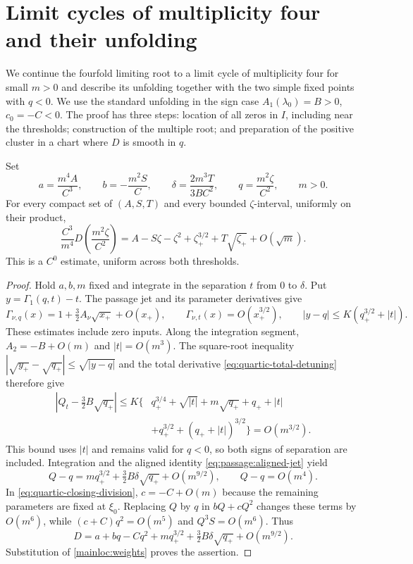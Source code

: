 \section{Limit cycles of multiplicity four and their unfolding}
\label{sec:actual-bifurcations}

We continue the fourfold limiting root to a limit cycle of multiplicity four
for small $m>0$ and describe its unfolding together with the two simple fixed
points with $q<0$. We use the standard unfolding in the sign case
$A_1(\lambda_0)=B>0$, $c_0=-C<0$. The proof has three steps: location of all
zeros in $I$, including near the thresholds; construction of the multiple
root; and preparation of the positive cluster in a chart where $D$ is smooth
in $q$.

\begin{lemma}
\label{mainloc:cross-event}
Set
\begin{equation}\label{mainloc:weights}
 a=\frac{m^4A}{C^3},\qquad b=-\frac{m^2S}{C},\qquad
 \delta=\frac{2m^3T}{3BC^2},\qquad q=\frac{m^2\zeta}{C^2},
 \qquad m>0.
\end{equation}
For every compact set of $(A,S,T)$ and every bounded $\zeta$-interval,
uniformly on their product,
\begin{equation}\label{mainloc:full-limit}
 \frac{C^3}{m^4}D\left(\frac{m^2\zeta}{C^2}\right)
 =A-S\zeta-\zeta^2+\zeta_+^{3/2}
                 +T\sqrt{\zeta_+}+O(\sqrt m).
\end{equation}
This is a $C^0$ estimate, uniform across both thresholds.
\end{lemma}

\begin{proof}
Hold $a,b,m$ fixed and integrate in the separation $t$ from $0$
to $\delta$. Put $y=\Gamma_1(q,t)-t$. The passage
jet and its parameter derivatives give
\[
 \Gamma_{\nu,q}(x)=1+\tfrac32A_\nu\sqrt{x_+}+O(x_+),\qquad
 \Gamma_{\nu,t}(x)=O(x_+^{3/2}),\qquad
 |y-q|\le K(q_+^{3/2}+|t|).
\]
These estimates include zero inputs. Along the integration segment,
$A_2=-B+O(m)$ and $|t|=O(m^3)$. The square-root inequality
$|\sqrt{y_+}-\sqrt{q_+}|\le\sqrt{|y-q|}$ and the total derivative
\eqref{eq:quartic-total-detuning} therefore give
\begin{align*}
 \left|Q_t-\tfrac32B\sqrt{q_+}\right|
 \le K\{&q_+^{3/4}+\sqrt{|t|}+m\sqrt{q_+}+q_++|t|\\
        &+q_+^{3/2}+(q_++|t|)^{3/2}\}=O(m^{3/2}).
\end{align*}
This bound uses $|t|$ and remains valid for $q<0$, so both signs
of separation are included. Integration and the aligned identity
\eqref{eq:passage:aligned-jet} yield
\[
 Q-q=mq_+^{3/2}+\tfrac32B\delta\sqrt{q_+}+O(m^{9/2}),
 \qquad Q-q=O(m^4).
\]
In \eqref{eq:quartic-closing-division}, $c=-C+O(m)$ because the
remaining parameters are fixed at $\xi_0$. Replacing $Q$ by $q$
in $bQ+cQ^2$ changes these terms by $O(m^6)$, while
$(c+C)q^2=O(m^5)$ and $Q^3S=O(m^6)$. Thus
\[
 D=a+bq-Cq^2+mq_+^{3/2}
                    +\tfrac32B\delta\sqrt{q_+}+O(m^{9/2}).
\]
Substitution of \eqref{mainloc:weights} proves the assertion.
\end{proof}

